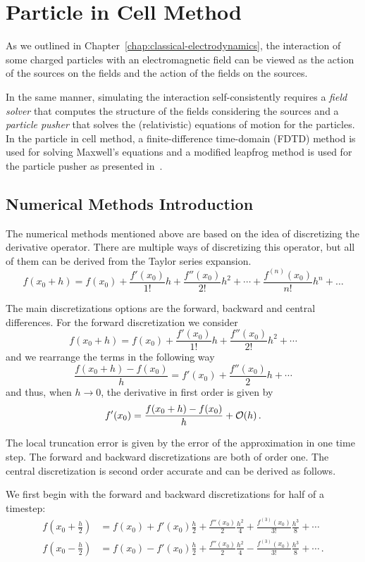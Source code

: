 \documentclass[12pt, class=report, crop=false]{standalone}
\begin{document}
\chapter{Particle in Cell Method}%
\label{chap:pic}

As we outlined in Chapter~\ref{chap:classical-electrodynamics}, the interaction
of some charged particles with an electromagnetic field can be viewed as the
action of the sources on the fields and the action of the fields on the sources.

In the same manner, simulating the interaction self-consistently requires a
\emph{field solver} that computes the structure of the fields considering
the sources and a \emph{particle pusher} that solves the (relativistic)
equations of motion for the particles.
In the particle in cell method, a finite-difference time-domain (FDTD) method
is used for solving Maxwell's equations and a modified leapfrog method is used
for the particle pusher as presented in~\cite{arber_contemporaryparticleincell_2015}.

\section{Numerical Methods Introduction}

The numerical methods mentioned above are based on the idea of discretizing the
derivative operator. There are multiple ways of discretizing this operator,
but all of them can be derived from the Taylor series expansion.
\[
  f(x_0+h) = f(x_0) + \frac{f'(x_0)}{1!}h + \frac{f''(x_0)}{2!}h^2 + \dotsb + \frac{f^{(n)}(x_0)}{n!}h^n + \dots
\]

The main discretizations options are the forward, backward and central differences.
For the forward discretization we consider
\[
  f(x_0+h) = f(x_0) + \frac{f'(x_0)}{1!}h + \frac{f''(x_0)}{2!}h^2 + \dotsb
\]
and we rearrange the terms in the following way
\[
  \frac{f(x_0+h) - f(x_0)}{h} = f'(x_0) + \frac{f''(x_0)}{2}h + \dotsb
\]
and thus, when \(h \to 0\), the derivative in first order is given by
\[
  f'(x_0) = \frac{f(x_0+h) - f(x_0)}{h} + \order{h}\,.
\]

The local truncation error is given by the error of the approximation in one time
step. The forward and backward discretizations are both of order one. The
central discretization is second order accurate and can be derived as follows.

We first begin with the forward and backward discretizations for half of a
timestep:
\begin{align*}
  f(x_0+\frac{h}{2}) &= f(x_0) + f'(x_0)\frac{h}{2} + \frac{f''(x_0)}{2}\frac{h^2}{4}
    + \frac{f^{(3)}(x_0)}{3!}\frac{h^3}{8} + \dotsb \\
  f(x_0-\frac{h}{2}) &= f(x_0) - f'(x_0)\frac{h}{2} + \frac{f''(x_0)}{2}\frac{h^2}{4}
    - \frac{f^{(3)}(x_0)}{3!}\frac{h^3}{8} + \dotsb \,.
\end{align*}
\end{document}

